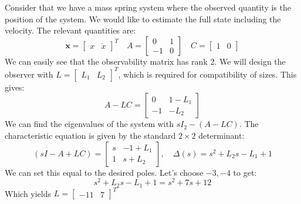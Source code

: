 \begin{example}
Consider that we have a mass spring system where the observed quantity is the position of the system. We would like to estimate the full state including the velocity. The relevant quantities are:
$$\bm{x}=\begin{bmatrix}
    x&\dot{x}
\end{bmatrix}^T\quad A=\begin{bmatrix}
    0&1\\-1&0
\end{bmatrix}\quad C=\begin{bmatrix}
    1&0
\end{bmatrix}$$
We can easily see that the observability matrix has rank 2. We will design the observer with $L=\begin{bmatrix}
    L_1&L_2
\end{bmatrix}^T$, which is required for compatibility of sizes. This gives:
$$A-LC=\begin{bmatrix}
0&1-L_1\\-1&-L_2
\end{bmatrix}$$
We can find the eigenvalues of the system with $sI_2-(A-LC)$. The characteristic equation is given by the standard $2\times2$ determinant:
$$(sI-A+LC)=\begin{bmatrix}
    s&-1+L_1\\1&s+L_2
\end{bmatrix},\quad\Delta(s)=s^2+L_2s-L_1+1$$
We can set this equal to the desired poles. Let's choose $-3,-4$ to get:
$$s^2+L_2s-L_1+1=s^2+7s+12$$
Which yields $L=\begin{bmatrix}
-11&7
\end{bmatrix}^T$
    
\end{example}

